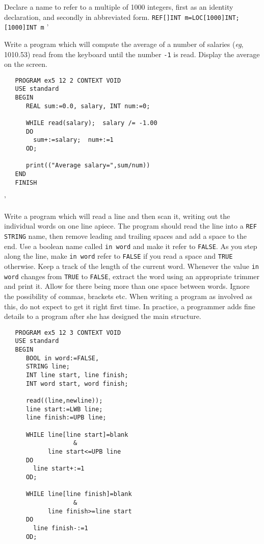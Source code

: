 \begin{exercise}
\item Declare a name to refer to a multiple of 1000 integers, first as
an identity declaration, and secondly in abbreviated form.
\ans \verb|REF[]INT m=LOC[1000]INT;| \verb|[1000]INT m|
'
\item Write a program which will compute the average of a number of
salaries ({\it eg}, 1010.53) read from the keyboard until the number
\verb|-1| is read. Display the average on the screen. \ans \ %
\begin{verbatim}
   PROGRAM ex5 12 2 CONTEXT VOID
   USE standard
   BEGIN
      REAL sum:=0.0, salary, INT num:=0;

      WHILE read(salary);  salary /= -1.00
      DO
        sum+:=salary;  num+:=1
      OD;

      print(("Average salary=",sum/num))
   END
   FINISH
\end{verbatim}
'
\item Write a program which will read a line and then scan it,
writing out the individual words on one line apiece. The program
should read the line into a \verb|REF STRING| name, then remove
leading and trailing spaces and add a space to the end. Use a
boolean name called \verb|in word| and make it refer to \verb|FALSE|.
As you step along the line, make \verb|in word| refer to \verb|FALSE|
if you read a space and \verb|TRUE| otherwise. Keep a track of the
length of the current word. Whenever the value \verb|in word| changes
from \verb|TRUE| to \verb|FALSE|, extract the word using an
appropriate trimmer and print it. Allow for there being more than one
space between words. Ignore the possibility of commas, brackets etc.
\ans When writing a program as involved as this, do not expect to get
it right first time. In practice, a programmer adds fine details to a
program after she has designed the main structure.
\begin{verbatim}
   PROGRAM ex5 12 3 CONTEXT VOID
   USE standard
   BEGIN
      BOOL in word:=FALSE,
      STRING line;
      INT line start, line finish;
      INT word start, word finish;

      read((line,newline));
      line start:=LWB line;
      line finish:=UPB line;

      WHILE line[line start]=blank
                   &
            line start<=UPB line
      DO
        line start+:=1
      OD;

      WHILE line[line finish]=blank
                   &
            line finish>=line start
      DO
        line finish-:=1
      OD;


\end{verbatim}
\end{exercise}
